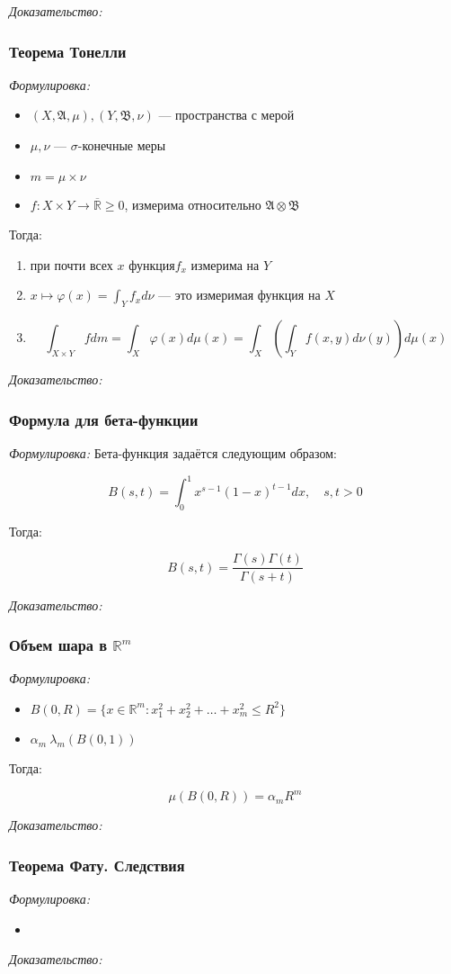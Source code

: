 \documentclass{article}
\def\rinf{\overline{\mathbb{R}}}
\begin{document}
\textit{Доказательство:}

\subsubsection{Теорема Тонелли}
\textit{Формулировка:}

\begin{itemize}
    \item $(X, \mathfrak{A}, \mu), (Y, \mathfrak{B}, \nu)$ --- пространства с мерой
    \item $\mu, \nu$ --- $\sigma$-конечные меры
    \item $m = \mu \times \nu$
    \item $f: X \times Y \rightarrow \rinf \ge 0$, измерима относительно $\mathfrak{A} \otimes \mathfrak{B}$
\end{itemize}

Тогда:

\begin{enumerate}
    \item при почти всех $x$ функция$f_{x}$ измерима на $Y$
    \item $x \mapsto \varphi(x) = \int_{Y} f_{x} d\nu$ --- это измеримая функция на $X$
    \item \[\int_{X \times Y} f dm= \int_{X} \varphi(x) d \mu(x) = \int_{X} \left( \int_{Y} f(x, y) d  \nu (y)\right) d \mu(x)\]
\end{enumerate}

\textit{Доказательство:}



\subsubsection{Формула для бета-функции}
\textit{Формулировка:}
Бета-функция задаётся следующим образом: 

\[B(s, t) = \int_{0}^{1}x^{s - 1}(1 - x)^{t - 1}dx, \quad s, t > 0\]

Тогда:

\[B(s, t) = \frac{\Gamma(s)\Gamma(t)}{\Gamma(s + t)}\]

\textit{Доказательство:}

\subsubsection{Объем шара в $\mathbb{R}^m$}
\textit{Формулировка:}

\begin{itemize}
    \item $B(0, R) = \{x \in \mathbb{R}^{m}: x_1^{2} + x_2^{2} + \ldots + x_m^{2} \le R^{2}\}$
    \item $\alpha_{m} \ \lambda_{m}(B(0, 1))$
\end{itemize}

Тогда: 

\[\mu\left(B(0, R)\right) = \alpha_m R^{m}\]

\textit{Доказательство:}

\subsubsection{Теорема Фату. Следствия}
\textit{Формулировка:}

\begin{itemize}
    \item 
\end{itemize}

\textit{Доказательство:}
\newpage
\end{document}
